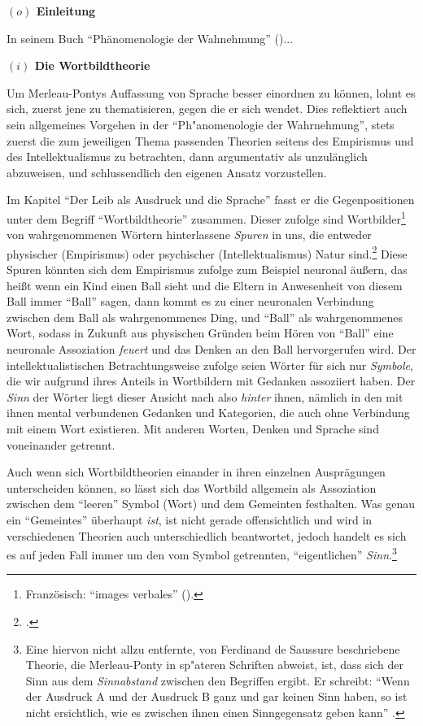 \documentclass[a4paper, 12pt]{article}
\begin{document}
\begin{onehalfspace} 

\noindent\textbf{$(o)$ Einleitung}

\noindent In seinem Buch "`Phänomenologie der Wahnehmung"' (\Cite{merleau1966phanomenologie})...


\vspace{5mm}

\noindent\textbf{$(i)$ Die Wortbildtheorie}

\noindent Um Merleau-Pontys Auffassung von Sprache besser einordnen zu können, lohnt es sich, zuerst jene zu thematisieren, gegen die er sich wendet. Dies reflektiert auch sein allgemeines Vorgehen in der "`Ph"anomenologie der Wahrnehmung"', stets zuerst die zum jeweiligen Thema passenden Theorien seitens des Empirismus und des Intellektualismus zu betrachten, dann argumentativ als unzulänglich abzuweisen, und schlussendlich den eigenen Ansatz vorzustellen. 

Im Kapitel "`Der Leib als Ausdruck und die Sprache"' fasst er die Gegenpositionen unter dem Begriff "`Wortbildtheorie"' zusammen. Dieser zufolge sind Wortbilder\footnote{Französisch: "`images verbales"' (\Cite[Siehe][S. 203]{franzoesisch_phen}).} von wahrgenommenen Wörtern hinterlassene \emph{Spuren} in uns, die entweder physischer (Empirismus) oder psychischer (Intellektualismus) Natur sind.\footnote{\Cite[Vgl.][S. 208]{merleau1966phanomenologie}.} Diese Spuren könnten sich dem Empirismus zufolge zum Beispiel neuronal äußern, das heißt wenn ein Kind einen Ball sieht und die Eltern in Anwesenheit von diesem Ball immer "`Ball"' sagen, dann kommt es zu einer neuronalen Verbindung zwischen dem Ball als wahrgenommenes Ding, und "`Ball"' als wahrgenommenes Wort, sodass in Zukunft aus physischen Gründen beim Hören von "`Ball"' eine neuronale Assoziation \emph{feuert} und das Denken an den Ball hervorgerufen wird. Der intellektualistischen Betrachtungsweise zufolge seien Wörter für sich nur \emph{Symbole}, die wir aufgrund ihres Anteils in Wortbildern mit Gedanken assoziiert haben. Der \emph{Sinn} der Wörter liegt dieser Ansicht nach also \emph{hinter} ihnen, nämlich in den mit ihnen mental verbundenen Gedanken und Kategorien, die auch ohne Verbindung mit einem Wort existieren. Mit anderen Worten, Denken und Sprache sind voneinander getrennt.

Auch wenn sich Wortbildtheorien einander in ihren einzelnen Ausprägungen unterscheiden können, so lässt sich das Wortbild allgemein als Assoziation zwischen dem "`leeren"' Symbol (Wort) und dem Gemeinten festhalten. Was genau ein "`Gemeintes"' überhaupt \emph{ist}, ist nicht gerade offensichtlich und wird in verschiedenen Theorien auch unterschiedlich beantwortet, jedoch handelt es sich es auf jeden Fall immer um den vom Symbol getrennten, "`eigentlichen"' \emph{Sinn}.\footnote{Eine hiervon nicht allzu entfernte, von Ferdinand de Saussure beschriebene Theorie, die Merleau-Ponty in sp"ateren Schriften abweist, ist, dass sich der Sinn aus dem \emph{Sinnabstand} zwischen den Begriffen ergibt. Er schreibt: "`Wenn der Ausdruck A und der Ausdruck B ganz und gar keinen Sinn haben, so ist nicht ersichtlich, wie es zwischen ihnen einen Sinngegensatz geben kann"' .} 


\end{onehalfspace}
\end{document}
